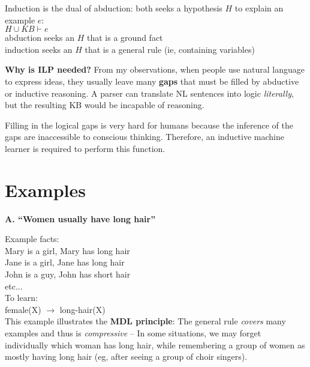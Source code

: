 Induction is the dual of abduction:  both seeks a hypothesis $H$ to explain an example $e$:\\
\hspace*{1cm} $H \cup KB \vdash e$\\
\hspace*{1cm} abduction seeks an $H$ that is a ground fact\\
\hspace*{1cm} induction seeks an $H$ that is a general rule (ie, containing variables)

\textbf{Why is ILP needed?}  From my observations, when people use natural language to express ideas, they usually leave many \textbf{gaps} that must be filled by abductive or inductive reasoning.  A parser can translate NL sentences into logic \textit{literally}, but the resulting KB would be incapable of reasoning.

Filling in the logical gaps is very hard for humans because the inference of the gaps are inaccessible to conscious thinking.  Therefore, an inductive machine learner is required to perform this function.

\section{Examples}

\textbf{A. ``Women usually have long hair''}

Example facts:\\
\hspace*{1cm} Mary is a girl, Mary has long hair\\
\hspace*{1cm} Jane is a girl, Jane has long hair\\
\hspace*{1cm} John is a guy, John has short hair\\
\hspace*{1cm} etc...\\
To learn:\\
\hspace*{1cm} female(X) $\rightarrow$ long-hair(X)\\

This example illustrates the \textbf{MDL principle}:  The general rule \textit{covers} many examples and thus is \textit{compressive} -- In some situations, we may forget individually which woman has long hair, while remembering a group of women as mostly having long hair (eg, after seeing a group of choir singers).

